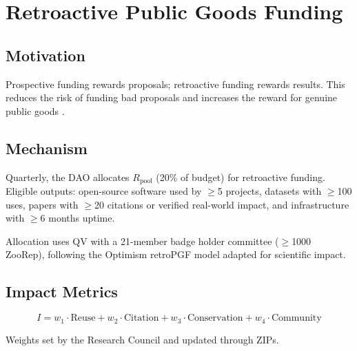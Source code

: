 \section{Retroactive Public Goods Funding}

\label{sec:retro}

\subsection{Motivation}

Prospective funding rewards proposals; retroactive funding rewards
results. This reduces the risk of funding bad proposals and increases
the reward for genuine public goods \citep{boudreau2016looking}.

\subsection{Mechanism}

Quarterly, the DAO allocates $R_{\text{pool}}$ (20\% of budget) for
retroactive funding. Eligible outputs: open-source software used by
$\geq$5 projects, datasets with $\geq$100 uses, papers with $\geq$20
citations or verified real-world impact, and infrastructure with
$\geq$6 months uptime.

Allocation uses QV with a 21-member badge holder committee ($\geq$1000
ZooRep), following the Optimism retroPGF model
\citep{optimism2023retropgf} adapted for scientific impact.

\subsection{Impact Metrics}

\begin{equation}
  I = w_1 \cdot \text{Reuse} + w_2 \cdot \text{Citation} +
  w_3 \cdot \text{Conservation} + w_4 \cdot \text{Community}
\end{equation}

Weights set by the Research Council and updated through ZIPs.


